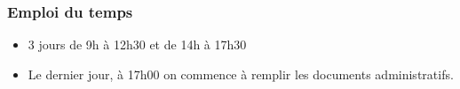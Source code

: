 
\begin{frame}
  \frametitle{Emploi du temps}
  \begin{itemize}
  \item 3 jours de 9h à 12h30 et de 14h à 17h30
  \item Le dernier jour, à 17h00 on commence à remplir les documents administratifs.
  \end{itemize}
\end{frame}
